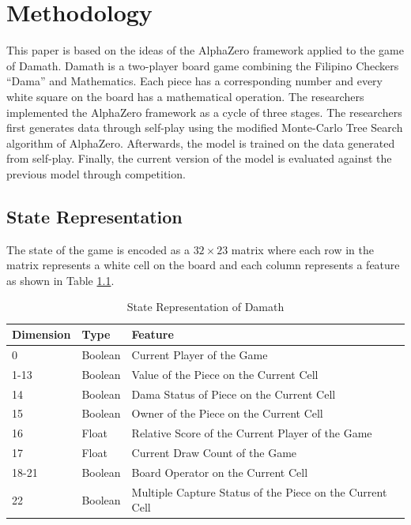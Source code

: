 \chapter{Methodology}

This paper is based on the ideas of the AlphaZero framework applied to the game of Damath. Damath is a two-player board game combining the Filipino Checkers ``Dama'' and Mathematics. Each piece has a corresponding number and every  white square on the board has a mathematical operation. The researchers implemented the AlphaZero framework as a cycle of three stages. The researchers first generates data through self-play using the modified Monte-Carlo Tree Search algorithm of AlphaZero. Afterwards, the model is trained on the data generated from self-play. Finally, the current version of the model is evaluated against the previous model through competition.

\section{State Representation}
The state of the game is encoded as a $32 \times 23$ matrix where each row in the matrix represents a white cell on the board and each column represents a feature as shown in Table \ref{tab:state-representation-damath}. 


\begin{table}[H]
  \centering
  \begin{tabular}{lll}
    \hline 
    Dimension & Type    & Feature                                                  \\ \hline
    0         & Boolean & Current Player of the Game                               \\
    1-13      & Boolean & Value of the Piece on the Current Cell                   \\
    14        & Boolean & Dama Status of Piece on the Current Cell                 \\
    15        & Boolean & Owner of the Piece on the Current Cell                   \\
    16        & Float   & Relative Score of the Current Player of the Game         \\
    17        & Float   & Current Draw Count of the Game                           \\
    18-21     & Boolean & Board Operator on the Current Cell                       \\
    22        & Boolean & Multiple Capture Status of the Piece on the Current Cell \\ \hline
  \end{tabular}
  \caption{State Representation of Damath}
  \label{tab:state-representation-damath}
\end{table}

